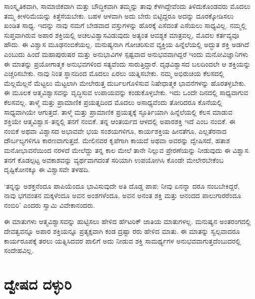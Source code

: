 ಸಾಂಸ್ಕೃತಿಕವಾಗಿ, ಸಾಮಾಜಿಕವಾಗಿ ಮತ್ತು ಬೌದ್ಧಿಕವಾಗಿ ತಮ್ಮನ್ನು ತಾವು ಕೆಳಗಿದ್ದೇವೆಂದು ತಿಳಿದು\-ಕೊಂಡವರು ಮೊದಲು ತಮ್ಮ ಕೀಳರಿಮೆಯನ್ನು ಕಿತ್ತೆಸೆಯಬೇಕು. ಬಹಳ ಆಳವಾಗಿ ಅದು ಬೇರು ಬಿಟ್ಟಿದ್ದರೂ ಅದನ್ನು ದೂರಕ್ಕೋಡಿಸಲು ಖಂಡಿತ ಸಾಧ್ಯ. ಇದನ್ನು ನಾವು ನಮಗೆ ಬೇಡವಾದ ವಸ್ತುಗಳನ್ನು ಹೊರಕ್ಕೆ ಎಸೆದಂತೆ ಎಸೆಯಲು ಸಾಧ್ಯವಿಲ್ಲ. ನಮ್ಮಲ್ಲಿ ಸುಪ್ತವಾಗಿರುವ ಅಪಾರ ಶಕ್ತಿಯಲ್ಲಿ ಅಚಲವಿಶ್ವಾಸವಿಡುವುದು ಅತ್ಯಂತ ಆವಶ್ಯಕ ಮಾತ್ರವಲ್ಲ, ಮೊದಲ ಕರ್ತವ್ಯವೂ ಹೌದು. ಈ ವಿಶ್ವಾಸ ಮೂಢನಂಬಿಕೆಯಲ್ಲ. ಮನುಷ್ಯನಾಗಿ ಗೋಚರಿಸುವ ವ್ಯಕ್ತಿಯ ಹಿನ್ನೆಲೆಯಲ್ಲಿ ಅದ್ಭುತ ಶಕ್ತಿ ಅಡಗಿದೆ ಎಂಬುದು ಹಿಂದೆ ಮಹಾಪುರುಷರ ಮತ್ತು ಅನುಭಾವಿಗಳ ಸ್ಪಷ್ಟವಾದ ಅನುಭವವಾಗಿದ್ದರೆ ಇಂದು ಮನೋವಿಜ್ಞಾನಿಗಳು ಈ ಮಾತನ್ನು ಪ್ರಯೋಗಾತ್ಮಕ ಅನುಭವಗಳಿಂದ ಸತ್ಯವೆಂದು ಸಾರುತ್ತಿದ್ದಾರೆ. ದೃಢವಿಶ್ವಾಸದ ಬಲದಿಂದಲೇ ಆ ಶಕ್ತಿಯನ್ನು ಎಚ್ಚರಿಸಬೇಕು. ನಾವು ನಿಂತ ಸ್ಥಾನದಿಂದ ಮೊದಲು ಏರಲು ಯತ್ನಿಸಬೇಕು. ನಮ್ಮ ಅಭಿರುಚಿಯ ಕೆಲಸದಲ್ಲಿ ಮೆಲ್ಲಮೆಲ್ಲನೆ ಮೆಟ್ಟಲು ಮೆಟ್ಟಲಾಗಿ ಮೇಲೇರುತ್ತ ದುರ್ಬಲಗೊಳಿಸುವ ನಿಷೇಧಾತ್ಮಕ ಭಾವನೆಗಳನ್ನು ಹೊರತಳ್ಳಬೇಕು. ಈ ಮೂಲಕ ಆತ್ಮವಿಶ್ವಾಸವನ್ನು ವೃದ್ಧಿಸುವ ಉಪಾಯವನ್ನು ಕಂಡುಕೊಳ್ಳಬೇಕು. ಇದು ಒಂದೇ ದಿನದಲ್ಲಿ ಸಾಧ್ಯವಾಗುವ ಕೆಲಸವಲ್ಲ. ತಾಳ್ಮೆ ಮತ್ತು ಪ್ರಾಮಾಣಿಕ ಪ್ರಯತ್ನದಿಂದ ಮೊದಲು ಅಸಾಧ್ಯವೆಂದು ತೋರಿದರೂ ಕೊನೆಯಲ್ಲಿ ಸಾಧ್ಯವಾಗಿಯೇ ಆಗುತ್ತದೆ. ತಾಳ್ಮೆ ಮತ್ತು ಪ್ರಾಮಾಣಿಕ ಪ್ರಯತ್ನಕ್ಕೆ ಸ್ಫೂರ್ತಿಯಾಗಿ ಹಿನ್ನೆಲೆಯಲ್ಲಿ ಕೆಲಸ ಮಾಡುವ ಶಕ್ತಿಯೇ ಆತ್ಮವಿಶ್ವಾಸ–ತನ್ನಲ್ಲಿ ತನಗೆ ನಂಬಿಕೆ. ತನ್ನ ಆಂತರ್ಯದ ಆಳದಲ್ಲಿ ಅಪಾರಶಕ್ತಿ ಇದೆ ಎಂಬ ನಂಬಿಕೆ. ಈ ನಂಬಿಕೆ ಅಥವಾ ವಿಶ್ವಾಸದ ಅಭಾವವೇ ಭಯ ಸಂಶಯಗಳಿಗೂ, ಕಾರ್ಯಶಕ್ತಿಯ ಹೀನತೆಗೂ, ಎಲ್ಲತೆರನಾದ ದೌರ್ಬಲ್ಯಗಳಿಗೂ ಕಾರಣವಾಗುತ್ತದೆ. ಮೇಲಿನವರ ಕೃಪೆಗಾಗಿ ಕಾಯದೆ ಅಥವಾ ಅವರನ್ನು ದ್ವೇಷಿಸದೆ, ಹತಾಶ ಮನೋಭಾವನೆಯಿಂದ ನರಳದೆ ಮೇಲೆದ್ದು ತನ್ನ ಕಾಲ ಮೇಲೆ ತಾನೇ ನಿಲ್ಲುವ ಪ್ರೇರಣೆಯನ್ನು ನೀಡುವುದು ಈ ವಿಶ್ವಾಸ. ತನಗೆ ಕೊಡಲ್ಪಟ್ಟ ಅವಕಾಶವನ್ನು ವ್ಯರ್ಥವಾಗದಂತೆ ಸರಿಯಾಗಿ ಉಪಯೋಗಿಸಿ ಕೊಂಡೇ ಮೇಲೇರಬೇಕೆಂಬ ದೃಷ್ಟಿಕೋನಕ್ಕೂ ಈ ವಿಶ್ವಾಸವೇ ತಳಹದಿ.

‘ತನ್ನನ್ನು ಅಶಕ್ತನೆಂದೂ ಪಾಪಿಯೆಂದೂ ಭಾವಿಸುವುದೇ ಅತಿ ದೊಡ್ಡ ಪಾಪ; ನೀವು ಏನನ್ನಾ ದರೂ ನಂಬಬೇಕಿದ್ದರೆ, ನಾವು ಭಗವಂತನ ಮಕ್ಕಳೆಂದೂ ಅವನ ಅಂಶಗಳೆಂದೂ, ಅವನ ಅನಂತ ಶಕ್ತಿ ಮತ್ತು ಆನಂದದ ಪಾಲುಗಾರರೆಂದೂ ನಂಬಿರಿ’ ಎಂದರು ಸ್ವಾಮಿ ವಿವೇಕಾನಂದರು.

ಈ ಮಾತುಗಳು ಆತ್ಮವಿಶ್ವಾಸವನ್ನು ಹುಟ್ಟಿಸಲು ಹೇಳಿದ ರ್ಹೆಟರಿಕ್ ಜಾತಿಯ ಮಾತುಗಳಲ್ಲ. ಮನುಷ್ಯನ ಅಂತರಂಗದಲ್ಲಿ ದೇವತ್ವವನ್ನೂ ಅಪಾರ ಶಕ್ತಿಯನ್ನೂ ಪ್ರತ್ಯಕ್ಷವಾಗಿ ಕಂಡ ದ್ರಷ್ಟಾ ರರು ಹೇಳಿದ ಮಾತು. ಈ ಮಾತನ್ನು ಸ್ವಲ್ಪವಾದರೂ ಕಾರ್ಯರೂಪಕ್ಕೆ ತರಲು ಯತ್ನಿಸಿದವರ ಪಾಲಿಗೆ ಅದು ನೀಡುವ ಶಕ್ತಿ ಸಾಮರ್ಥ್ಯಗಳ ಅನುಭವವಾಗುತ್ತದೆಂಬುದರಲ್ಲಿ ಸಂದೇಹವಿಲ್ಲ.

\newpage


\section*{ದ್ವೇಷದ ದಳ್ಳುರಿ}


